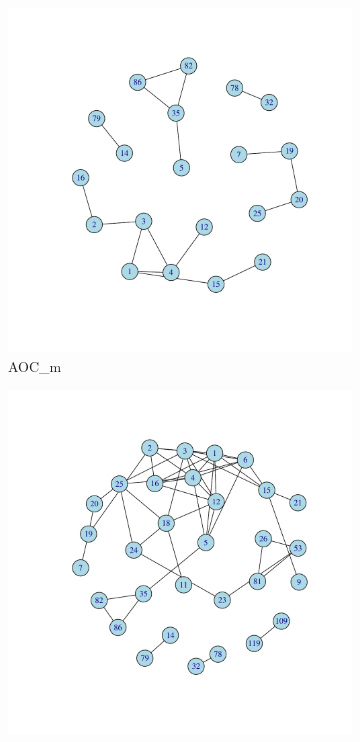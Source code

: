 \documentclass[12pt, oneside]{article}   	%
\begin{document}
\begin{figure}[H]
\centering
\begin{subfigure}[t]{0.48\textwidth}
\centering
\includegraphics[width=\linewidth]{fig7_overlapping_m.pdf}
\caption{AOC\_m}
\end{subfigure}
\hfill
\begin{subfigure}[t]{0.48\textwidth}
\centering
\includegraphics[width=\linewidth]{fig7_overlapping_k.pdf} 

\end{subfigure}
\end{figure}
\end{document}
